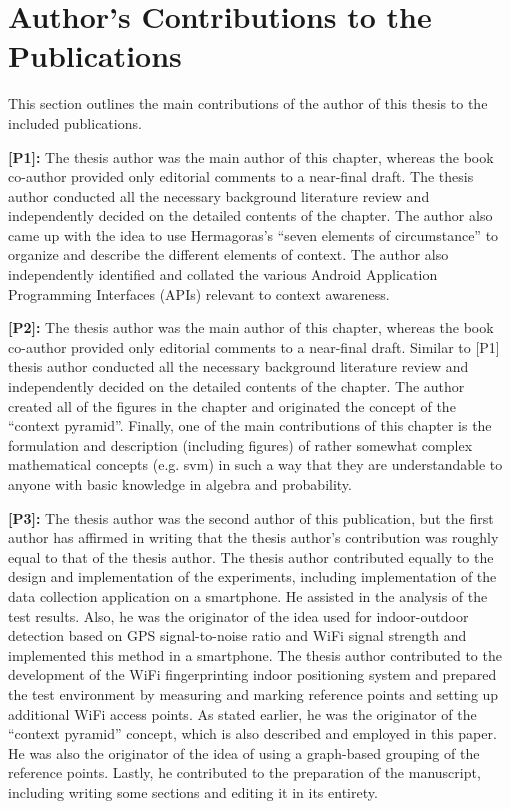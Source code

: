 \section{Author's Contributions to the Publications}
\label{sec:author_contributions}

This section outlines the main contributions of the author of this thesis to the included publications.

\textbf{[P1]:} The thesis author was the main author of this chapter, whereas the book co-author provided only editorial comments to a near-final draft. The thesis author conducted all the necessary background literature review and independently decided on the detailed contents of the chapter. The author also came up with the idea to use Hermagoras's ``seven elements of circumstance'' to organize and describe the different elements of context. The author also independently identified and collated the various Android Application Programming Interfaces (APIs) relevant to context awareness.

\textbf{[P2]:} The thesis author was the main author of this chapter, whereas the book co-author provided only editorial comments to a near-final draft. Similar to [P1] thesis author conducted all the necessary background literature review and independently decided on the detailed contents of the chapter. The author created all of the figures in the chapter and originated the concept of the ``context pyramid''. Finally, one of the main contributions of this chapter is the formulation and description (including figures) of rather somewhat complex mathematical concepts (e.g. \acrlong{svm}) in such a way that they are understandable to anyone with basic knowledge in algebra and probability.

\textbf{[P3]:} The thesis author was the second author of this publication, but the first author has affirmed in writing that the thesis author's contribution was roughly equal to that of the thesis author. The thesis author contributed equally to the design and implementation of the experiments, including implementation of the data collection application on a smartphone. He assisted in the analysis of the test results. Also, he was the originator of the idea used for indoor-outdoor detection based on GPS signal-to-noise ratio and WiFi signal strength and implemented this method in a smartphone. The thesis author contributed to the development of the WiFi fingerprinting indoor positioning system and prepared the test environment by measuring and marking reference points and setting up additional WiFi access points. As stated earlier, he was the originator of the ``context pyramid'' concept, which is also described and employed in this paper. He was also the originator of the idea of using a graph-based grouping of the reference points. Lastly, he contributed to the preparation of the manuscript, including writing some sections and editing it in its entirety.

